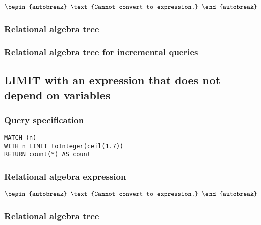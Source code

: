 \begin{align*}
\begin{autobreak}
\text{Cannot convert to expression.}
\end{autobreak}
\end{align*}

\subsubsection*{Relational algebra tree}


\subsubsection*{Relational algebra tree for incremental queries}


\subsection{LIMIT with an expression that does not depend on variables}

\subsubsection*{Query specification}

\begin{lstlisting}
MATCH (n)
WITH n LIMIT toInteger(ceil(1.7))
RETURN count(*) AS count
\end{lstlisting}

\subsubsection*{Relational algebra expression}

\begin{align*}
\begin{autobreak}
\text{Cannot convert to expression.}
\end{autobreak}
\end{align*}

\subsubsection*{Relational algebra tree}


